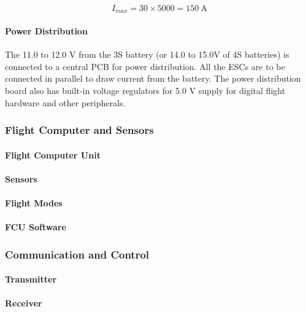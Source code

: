 $$
I_{max}=30 \times 5000 = 150~\text{A}
$$

\paragraph{Power Distribution}

The 11.0 to 12.0 V from the 3S battery (or 14.0 to 15.0V of 4S batteries) is connected to a  central PCB for power distribution. All the ESCs are to be connected in parallel to draw current from the battery. The power distribution board also has built-in voltage regulators for 5.0 V supply for digital flight hardware and other peripherals.


\subsubsection{Flight Computer and Sensors}
\paragraph{Flight Computer Unit}
\paragraph{Sensors}
\paragraph{Flight Modes}
\paragraph{FCU Software}

\subsubsection{Communication and Control}
\paragraph{Transmitter}
\paragraph{Receiver}
